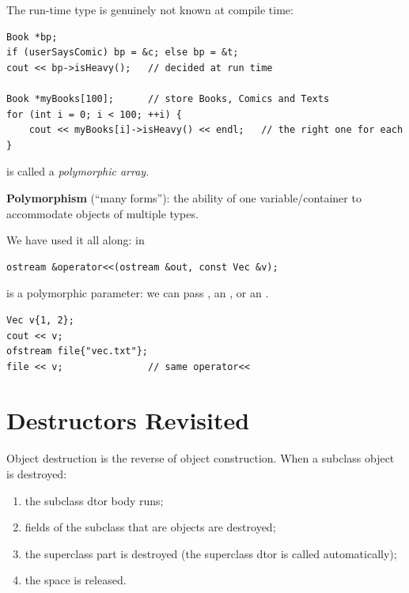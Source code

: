 The run-time type is genuinely not known at compile time:
\begin{lstlisting}[style=cpp]
Book *bp;
if (userSaysComic) bp = &c; else bp = &t;
cout << bp->isHeavy();   // decided at run time

Book *myBooks[100];      // store Books, Comics and Texts
for (int i = 0; i < 100; ++i) {
    cout << myBooks[i]->isHeavy() << endl;   // the right one for each
}
\end{lstlisting}
 is called a \emph{polymorphic array}.
\begin{center}
\end{center}

\begin{definition}
\textbf{Polymorphism} (``many forms''): the ability of one variable/container to
accommodate objects of multiple types.
\end{definition}
We have used it all along: in
\begin{lstlisting}[style=cpp]
ostream &operator<<(ostream &out, const Vec &v);
\end{lstlisting}
 is a polymorphic parameter: we can pass , an
, or an .
\begin{lstlisting}[style=cpp]
Vec v{1, 2};
cout << v;
ofstream file{"vec.txt"};
file << v;               // same operator<<
\end{lstlisting}

\section{Destructors Revisited}
Object destruction is the reverse of object construction. When a subclass
object is destroyed:
\begin{enumerate}
  \item the subclass dtor body runs;
  \item fields of the subclass that are objects are destroyed;
  \item the superclass part is destroyed (the superclass dtor is called
        automatically);
  \item the space is released.
\end{enumerate}


